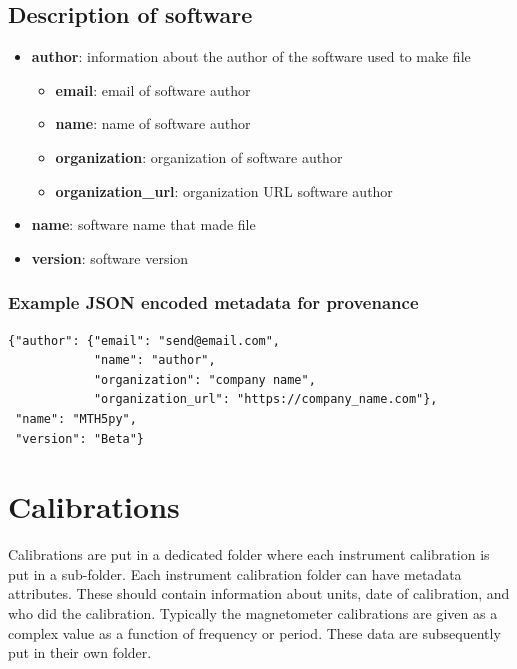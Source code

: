 \documentclass{article}
\newcommand{\attr}[1]{\textbf{#1}}
\begin{document}
\subsection{Description of \textbf{software}} 

\begin{itemize}
	\item \attr{author}: information about the author of the software used to make file
	\setlength{\itemsep}{.05em}
	\begin{itemize}
		\setlength{\itemsep}{.05em}
		\item \attr{email}: email of software author
		\item \attr{name}: name of software author
		\item \attr{organization}: organization of software author
		\item \attr{organization\_url}: organization URL software author
	\end{itemize}
	\item \attr{name}: software name that made file
	\item \attr{version}: software version 
\end{itemize}

\subsubsection{Example JSON encoded metadata for \textbf{provenance}}
\begin{verbatim}
{"author": {"email": "send@email.com",
            "name": "author",
            "organization": "company name",
            "organization_url": "https://company_name.com"},
 "name": "MTH5py",
 "version": "Beta"}
\end{verbatim}

\section{Calibrations}

Calibrations are put in a dedicated folder where each instrument calibration is put in a sub-folder.  Each instrument calibration folder can have metadata attributes.  These should contain information about units, date of calibration, and who did the calibration.  Typically the magnetometer calibrations are given as a complex value as a function of frequency or period.  These data are subsequently put in their own folder.
\end{document}
